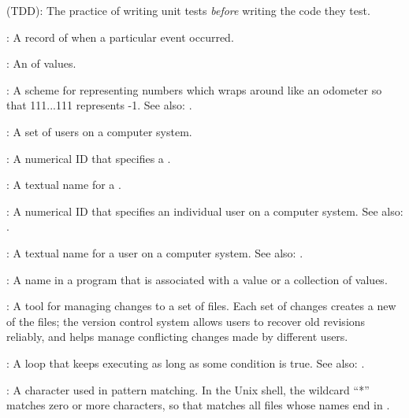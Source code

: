  (TDD):
The practice of writing unit
tests \emph{before} writing the code they test.
 
:
A record of when a particular event occurred.

:
An 
 of values.
 
:
A scheme for representing numbers which wraps around like an odometer
so that 111...111 represents -1.
See also: .
 
:
A set of users on a computer system.
 
:
A numerical ID that specifies a .
 
:
A textual name for a .
 
:
A numerical ID that specifies an individual user on a computer system.
See also: .
 
:
A textual name for a user on a computer system.
See also: .

:
A name in a program that is associated with a value
or a collection of values.

:
A tool for managing changes to a set of files.
Each set of changes creates a new  of the
files; the version control system allows users to recover old revisions
reliably, and helps manage conflicting changes made by different users.
 
:
A loop that keeps executing as long as some condition is true.
See also: .

:
A character used in pattern matching. In the Unix
shell, the wildcard ``*'' matches zero or more characters, so that
 matches all files whose names end in .
